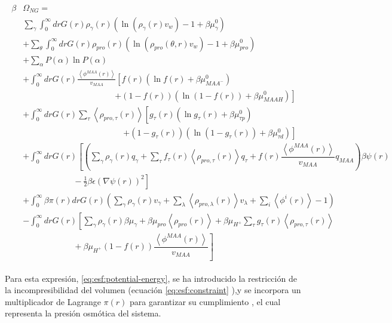 \begin{align}
	\begin{aligned}
		\beta&\Omega_{NG}=\\&  \sum_{\gamma}\int_0^\infty{dr G(r)\rho_\gamma(r)\left(\ln \left(\rho_\gamma (r)v_w\right) -1 + \beta\mu^0_\gamma\right)} \\
		& +\sum_\theta \int_0^\infty{dr G(r)\rho_{pro}(r)\left(\ln (\rho_{pro}(\theta,r)v_w)-1 + \beta\mu^0_{pro} \right)} \\
		& + \sum_{\alpha}{P(\alpha)\ln P(\alpha)} \\
		& +\int_0^\infty drG(r) \frac{\left<\phi^{MAA}(r)\right>}{v_{MAA}} \left[f(r)(\ln f(r)+ \beta\mu^0_{MAA^-})\right.\\
		&\qquad \qquad \qquad\qquad \qquad \quad \left.+(1-f(r))(\ln (1-f(r))+\beta\mu^0_{MAAH})\right] \\
		& +\int_0^\infty drG(r)\sum_\tau \left<\rho_{pro,\tau}(r)\right> \left[g_\tau(r)(\ln g_\tau(r)+ \beta\mu^0_{\tau p})\right.\\
		&\qquad\qquad \qquad\qquad \qquad \qquad\left.+(1-g_\tau(r))(\ln (1-g_\tau(r))+\beta\mu^0_{\tau d})\right] \\
		& +  \int_0^\infty drG(r)\left[\left(\sum_{\gamma } {\rho_\gamma(r) q_\gamma + \sum_\tau{f_\tau(r) \left<\rho_{pro,\tau}(r)\right> q_\tau} +  f(r)\dfrac{\left<\phi^{MAA}(r)\right>}{v_{MAA}}q_{MAA}}\right)\beta\psi(r) \right.\\  &\left. \hspace{6em}-\frac{1}{2}\beta\epsilon(\nabla\psi(r))^2 \right]\\
		&+ \int_0^\infty \beta\pi(r) drG(r){\left(\sum_{\gamma}\rho_\gamma(r) v_\gamma + \sum_{\lambda}{\left<\rho_{pro,\lambda}(r)\right>}{v_\lambda} + \sum_i\left<\phi^i(r)\right> -1\right)}\\
		& -\int_0^\infty drG(r)\left[\sum_{\gamma }{\rho_\gamma(r)\beta\mu_\gamma}
		+ \beta\mu_{pro} \left<\rho_{pro}(r)\right>
		+\beta\mu_{H^+}\sum_{\tau}{g_\tau(r)\left<\rho_{pro,\tau}(r)\right> } \right.\\
		& \left. \hspace{6em} +\beta\mu_{H^+}(1-f(r))\dfrac{\left<\phi^{MAA}(r)\right>}{v_{MAA}}\right]%
	\end{aligned}
	\label{eq:esf:potential-energy}
\end{align}


Para esta expresi\'on,  \ref{eq:esf:potential-energy}, se ha introducido la restricci\'on de la incompresibilidad del volumen (ecuaci\'on \ref{eq:esf:constraint} ),y se incorpora un multiplicador de Lagrange $\pi(r)$ para garantizar su cumplimiento , el cual representa la presi\'on osm\'otica del sistema. 

